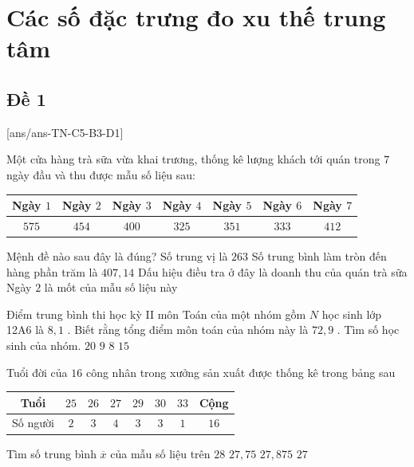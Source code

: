 \section{Các số đặc trưng đo xu thế trung tâm}


\subsection{Đề 1}
\caulc
{}[ans/ans-TN-C5-B3-D1]
\begin{ex}%
	Một cửa hàng trà sữa vừa khai trương, thống kê lượng khách tới quán trong $7$ ngày đầu và thu được mẫu số liệu sau:
	\begin{center}
		\begin{tabular}{|c|c|c|c|c|c|c|}
			\hline
			Ngày $1$ & Ngày $2$ & Ngày $3$ & Ngày $4$ & Ngày $5$ & Ngày $6$ & Ngày $7$\\
			\hline
			$575$ & $454$ & $400$ & $325$ & $351$ & $333$ & $412$\\
			\hline
		\end{tabular}
	\end{center}
	Mệnh đề nào sau đây là đúng?
	\choice
	{Số trung vị là $263$}
	{\True Số trung bình làm tròn đến hàng phần trăm là $407{,}14$}
	{Dấu hiệu điều tra ở đây là doanh thu của quán trà sữa}
	{Ngày $2$ là mốt của mẫu số liệu này}
\end{ex}
\begin{ex}%
	Điểm trung bình thi học kỳ II môn Toán của một nhóm gồm $N$ học sinh lớp 12A6 là $8{,}1$ . Biết rằng tổng điểm môn toán của nhóm này là $72{,}9$ . Tìm số học sinh của nhóm.
	\choice
	{$20$}
	{\True $9$}
	{$8$}
	{$15$}
\end{ex}
\begin{ex}%
	Tuổi đời của $16$ công nhân trong xưởng sản xuất được thống kê trong bảng sau
	\begin{center}
		\begin{tabular}{|c|c|c|c|c|c|c|c|}
			\hline Tuổi & $25$ & $26$ & $27$ & $29$ & $30$ & $33$ & Cộng \\
			\hline Số người & $2$ & $3$ & $4$ & $3$ & $3$ & $1$ & $16$ \\
			\hline
		\end{tabular}
	\end{center}
	Tìm số trung bình $\overline x $ của mẫu số liệu trên
	\choice
	{$ 28$}
	{$ 27{,}75$}
	{\True $ 27{,}875$}
	{$ 27$}
\end{ex}
